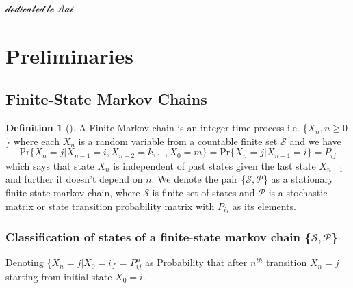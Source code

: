 \documentclass{article}
\theoremstyle{definition}
\newtheorem{definition}{Definition}[section]
\begin{document}
\clearpage
\vspace*{\fill}
\begin{center}
    \begin{center}
        \Large{$\mathcal{{dedicated\ to\ Aai}}$}
    \end{center}
    
\end{center}
\vspace*{\fill}
\clearpage
\pagestyle{fancy}
\tableofcontents
\clearpage

\section{Preliminaries}
\subsection{Finite-State Markov Chains}
\begin{definition}[]A Finite Markov chain is an integer-time process i.e. \{$X_n, n\geq0$\} where each $X_n$ is a random variable from a countable finite set $\mathcal{S}$ and we have
\[\text{Pr}\{X_n=j|X_{n-1}=i,X_{n-2}=k,\dotsc,X_0=m\} = \text{Pr}\{X_n=j|X_{n-1}=i\} = P_{ij}\]
which says that state $X_n$ is independent of past states given the last state $X_{n-1}$ and further it doesn't depend on $n$. 
We denote the pair \{$\mathcal{S},\mathcal{P}$\} as a stationary finite-state markov chain, where $\mathcal{S}$ is finite set of states and $\mathcal{P}$ is a stochastic matrix or state transition probability matrix with $P_{ij}$ as its elements.
\end{definition}

\subsubsection*{Classification of states of a finite-state markov chain \{$\mathcal{S},\mathcal{P}$\}}

Denoting \{$X_n=j|X_0=i$\} = $P_{ij}^{n}$ as Probability that after $n^{th}$ transition $X_n=j$ starting from initial state $X_0=i$.
\end{document}
